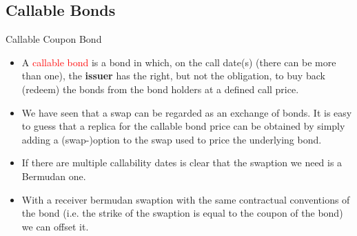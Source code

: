 \documentclass{beamer}
\begin{document}


\subsection{Callable Bonds}
\begin{frame}{Callable Coupon Bond}
\begin{itemize}
	\item<1-> A \textcolor{red}{callable bond} is a bond in which, on the call date(s) (there can be more than one), the \textbf{issuer} has the right, but not the obligation, to buy back (redeem) the bonds from the bond holders at a defined call price.
	\item<2-> We have seen that a swap can be regarded as an exchange of bonds. It is easy to guess that a replica for the callable bond price can be obtained by simply adding a (swap-)option to the swap used to price the underlying bond.
	\item<3-> If there are multiple callability dates is clear that the swaption we need is a Bermudan one.
	\item<4-> With a receiver bermudan swaption with the same contractual conventions of the bond (i.e. the strike of the swaption is equal to the coupon of the bond) we can offset it. %
\end{itemize}
\end{frame}
\end{document}

